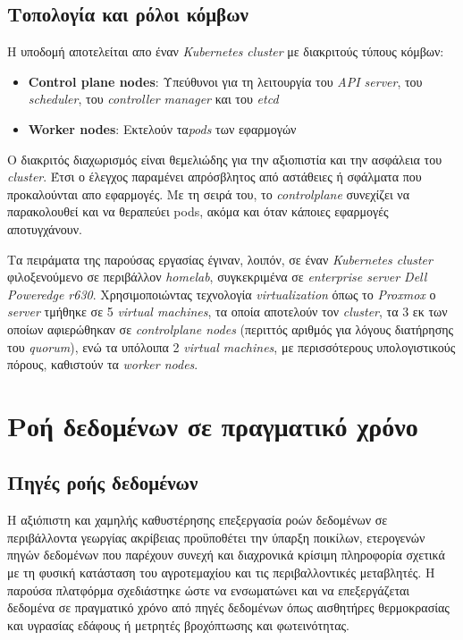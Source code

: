 \subsection{Τοπολογία και ρόλοι κόμβων}

Η υποδομή αποτελείται απο έναν \textit{Kubernetes cluster} με διακριτούς τύπους
κόμβων:

\begin{itemize}
	\item{\textbf{Control plane nodes}: Υπεύθυνοι για τη λειτουργία
	      του \textit{API server}, του \textit{scheduler}, του \textit{controller
		      manager} και του \textit{etcd}}
	\item{\textbf{Worker nodes}: Εκτελούν τα\textit{pods} των εφαρμογών}
\end{itemize}

Ο διακριτός διαχωρισμός είναι θεμελιώδης για την αξιοπιστία και την ασφάλεια
του \textit{cluster}. Έτσι ο έλεγχος παραμένει απρόσβλητος από αστάθειες ή
σφάλματα που προκαλούνται απο εφαρμογές. Με τη σειρά του, το
\textit{controlplane} συνεχίζει να παρακολουθεί και να θεραπεύει pods, ακόμα
και όταν κάποιες εφαρμογές αποτυγχάνουν.

Τα πειράματα της παρούσας εργασίας έγιναν, λοιπόν, σε έναν \textit{Kubernetes
	cluster} φιλοξενούμενο σε περιβάλλον \textit{homelab}, συγκεκριμένα σε
\textit{enterprise server Dell Poweredge r630}. Χρησιμοποιώντας τεχνολογία
\textit{virtualization} όπως το \textit{Proxmox} ο \textit{server} τμήθηκε σε 5
\textit{virtual machines}, τα οποία αποτελούν τον \textit{cluster}, τα 3 εκ των
οποίων αφιερώθηκαν σε \textit{controlplane nodes} (περιττός αριθμός για λόγους
διατήρησης του \textit{quorum}), ενώ τα υπόλοιπα 2 \textit{virtual machines},
με περισσότερους υπολογιστικούς πόρους, καθιστούν τα \textit{worker nodes}.

\section{Ροή δεδομένων σε πραγματικό χρόνο}

\subsection{Πηγές ροής δεδομένων}

Η αξιόπιστη και χαμηλής καθυστέρησης επεξεργασία ροών δεδομένων σε περιβάλλοντα
γεωργίας ακρίβειας προϋποθέτει την ύπαρξη ποικίλων, ετερογενών πηγών δεδομένων
που παρέχουν συνεχή και διαχρονικά κρίσιμη πληροφορία σχετικά με τη φυσική
κατάσταση του αγροτεμαχίου και τις περιβαλλοντικές μεταβλητές. Η παρούσα
πλατφόρμα σχεδιάστηκε ώστε να ενσωματώνει και να επεξεργάζεται δεδομένα σε
πραγματικό χρόνο από πηγές δεδομένων όπως αισθητήρες θερμοκρασίας και υγρασίας
εδάφους ή μετρητές βροχόπτωσης και φωτεινότητας.

